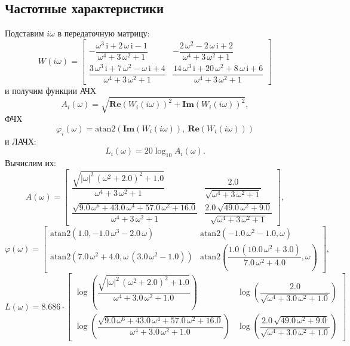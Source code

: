 \subsection{Частотные характеристики}
Подставим $i\omega$ в передаточную матрицу:
\begin{equation*}
    W(i\omega)=
    \begin{bmatrix}
        -\dfrac{\omega^3 \,\mathrm{i}+2\,\omega \,\mathrm{i}-1}{\omega^4 +3\,\omega^2 +1 } & 
        -\dfrac{2\,\omega^2 -2\,\omega \,\mathrm{i}+2}{\omega^4 +3\,\omega^2 +1 }\\[2ex]
        \dfrac{3\,\omega^3 \,\mathrm{i}+7\,\omega^2 -\omega \,\mathrm{i}+4}{\omega^4 +3\,\omega^2 +1 } & 
        \dfrac{14\,\omega^3 \,\mathrm{i}+20\,\omega^2 +8\,\omega \,\mathrm{i}+6}{\omega^4 +3\,\omega^2 +1 }
    \end{bmatrix}
\end{equation*}
и получим функции АЧХ 
$$A_i(\omega)=\sqrt{\mathbf{Re}(W_i(i\omega))^2+\mathbf{Im}(W_i(i\omega))^2},$$
ФЧХ
$$\varphi_i(\omega)=\text{atan2}\left( \mathbf{Im}(W_i(i\omega)),\ \mathbf{Re}(W_i(i\omega)) \right)$$
и ЛАЧХ:
$$L_i(\omega)=20\log_{10}A_i(\omega).$$
Вычислим их:
\begin{equation*}
    A(\omega)=
\begin{bmatrix}
\dfrac{\sqrt{{\left|\omega \right|}^2 \,{{\left(\omega^2 +2.0\right)}}^2 +1.0}}{\omega^4 +3\,\omega^2 +1 } & 
\dfrac{2.0}{\sqrt{\omega^4 +3\,\omega^2 +1 }} \\[2ex]
\dfrac{\sqrt{9.0\,\omega^6 +43.0\,\omega^4 +57.0\,\omega^2 +16.0}}{\omega^4 +3\,\omega^2 +1 } & 
\dfrac{2.0\,\sqrt{49.0\,\omega^2 +9.0}}{\sqrt{\omega^4 +3\,\omega^2 +1 }}
\end{bmatrix},
\end{equation*}
\begin{equation*}
    \varphi(\omega)=\begin{bmatrix}
\textrm{atan2}\left(1.0,-1.0\,\omega^3 -2.0\,\omega \right) & 
\textrm{atan2}\left(-1.0\,\omega^2 -1.0,\omega \right) \\[2ex]
\textrm{atan2}\left(7.0\,\omega^2 +4.0,\omega \,{\left(3.0\,\omega^2 -1.0\right)}\right) &
\textrm{atan2}\left(\dfrac{1.0\,{\left(10.0\,\omega^2 +3.0\right)}}{7.0\,\omega^2 +4.0},\omega \right)
\end{bmatrix},
\end{equation*}
\begin{equation*}
    L(\omega)=
    8.686\cdot\begin{bmatrix}
\log \left(\dfrac{\sqrt{{\left|\omega \right|}^2 \,{{\left(\omega^2 +2.0\right)}}^2 +1.0}}{\omega^4 +3.0\,\omega^2 +1.0 }\right) & 
\log \left(\dfrac{2.0}{\sqrt{\omega^4 +3.0\,\omega^2 +1.0 }}\right) \\[2ex]
\log \left(\dfrac{\sqrt{9.0\,\omega^6 +43.0\,\omega^4 +57.0\,\omega^2 +16.0}}{\omega^4 +3.0\,\omega^2 +1.0 }\right) &
\log \left(\dfrac{2.0\,\sqrt{49.0\,\omega^2 +9.0}}{\sqrt{\omega^4 +3.0\,\omega^2 +1.0 }}\right)
\end{bmatrix}
\end{equation*}
